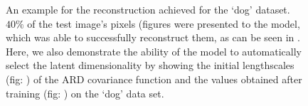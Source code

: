 \documentclass [10pt , a4paper]{article}
\begin{document}
\begin{figure}[ht]
\begin{center}
\end{center}
\caption{\small{
 An example for the reconstruction achieved for the `dog' dataset. $40\%$ of the test image's pixels (figures   were presented  to the model, which was able to successfully reconstruct them, as can be seen in .     
Here, we also demonstrate the ability of the model to automatically select the latent dimensionality by showing the initial lengthscales (fig: ) of the ARD covariance function and the values obtained after training (fig: ) on the `dog' data set.
}
}
\label{fig:dogRec}
\end{figure}

\end{document}
